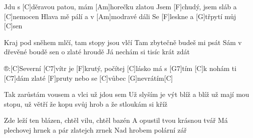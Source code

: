 
Jdu s [C]děravou patou, mám [Am]horečku zlatou
Jsem [F]chudý, jsem sláb a [C]nemocen
Hlava mě pálí a v [Am]modravé dáli
Se [F]leskne a [G]třpytí můj [C]sen

Kraj pod sněhem mlčí, tam stopy jsou vlčí
Tam zbytečně budeš mi psát
Sám v dřevěné boudě sen o zlaté hroudě
Já nechám si tisíc krát zdát

®:[C]Severní [C7]vítr je [F]krutý, 
počítej [C]lásko má s [G7]tím
[C]k nohám ti [C7]dám zlaté [F]pruty
nebo se [C]vůbec [G]nevrátím[C]

Tak zarůstám vousem a vlci už jdou sem
Už slyším je výt blíž a blíž
už mají mou stopu, už větří že kopu
svůj hrob a že stloukám si kříž

Zde leží ten blázen, chtěl vilu, chtěl bazén
A opustil tvou krásnou tvář
Má plechovej hrnek a pár zlatejch zrnek
Nad hrobem polární zář
